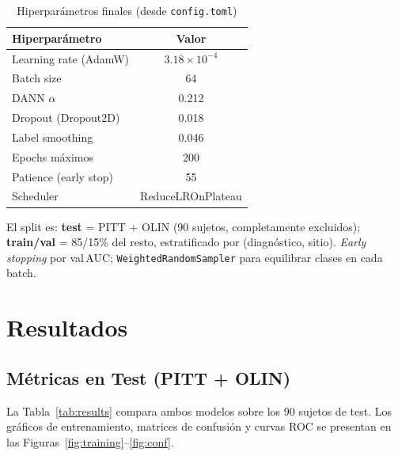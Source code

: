 \documentclass[conference]{IEEEtran}
\begin{document}
\begin{table}[h]
  \centering
  \caption{Hiperparámetros finales (desde \texttt{config.toml})}
  \label{tab:hparams}
  \begin{tabular}{lc}
    \toprule
    Hiperparámetro & Valor \\
    \midrule
    Learning rate (AdamW) & $3.18\times10^{-4}$ \\
    Batch size            & 64 \\
    DANN $\alpha$         & 0.212 \\
    Dropout (Dropout2D)   & 0.018 \\
    Label smoothing       & 0.046 \\
    Epochs máximos        & 200 \\
    Patience (early stop) & 55 \\
    Scheduler             & ReduceLROnPlateau \\
    \bottomrule
  \end{tabular}
\end{table}

El split es:
\textbf{test} = PITT + OLIN (90 sujetos, completamente excluidos);
\textbf{train/val} = 85/15\% del resto, estratificado por
(diagnóstico, sitio). \emph{Early stopping} por val\,AUC;
\texttt{WeightedRandomSampler} para equilibrar clases en cada batch.

\section{Resultados}

\subsection{Métricas en Test (PITT + OLIN)}

La Tabla~\ref{tab:results} compara ambos modelos sobre los 90 sujetos
de test. Los gráficos de entrenamiento, matrices de confusión y curvas
ROC se presentan en las Figuras~\ref{fig:training}--\ref{fig:conf}.
\end{document}
